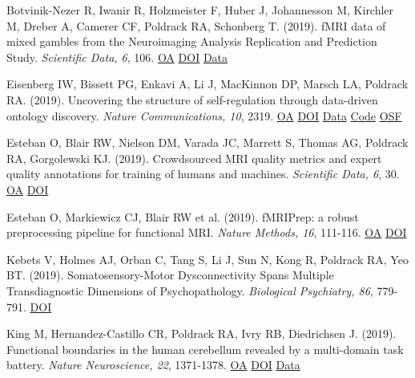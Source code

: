 \documentclass[10pt, letterpaper]{article}
\begin{document}
Botvinik-Nezer R, Iwanir R, Holzmeister F, Huber J, Johannesson M, Kirchler M, Dreber A, Camerer CF, Poldrack RA, Schonberg T.  (2019). fMRI data of mixed gambles from the Neuroimaging Analysis Replication and Prediction Study. \textit{Scientific Data, 6}, 106. \href{https://www.ncbi.nlm.nih.gov/pmc/articles/PMC6602933}{OA} \href{https://doi.org/10.1038/s41597-019-0113-7}{DOI} \href{https://openneuro.org/datasets/ds001734/versions/1.0.5}{Data} \vspace{2mm}

Eisenberg IW, Bissett PG, Enkavi A, Li J, MacKinnon DP, Marsch LA, Poldrack RA.  (2019). Uncovering the structure of self-regulation through data-driven ontology discovery. \textit{Nature Communications, 10}, 2319. \href{https://www.ncbi.nlm.nih.gov/pmc/articles/PMC6534563}{OA} \href{https://doi.org/10.1038/s41467-019-10301-1}{DOI} \href{https://github.com/IanEisenberg/Self_Regulation_Ontology/tree/master/Data}{Data} \href{https://github.com/IanEisenberg/Self_Regulation_Ontology}{Code} \href{https://osf.io/zk6w9/}{OSF} \vspace{2mm}

Esteban O, Blair RW, Nielson DM, Varada JC, Marrett S, Thomas AG, Poldrack RA, Gorgolewski KJ.  (2019). Crowdsourced MRI quality metrics and expert quality annotations for training of humans and machines. \textit{Scientific Data, 6}, 30. \href{https://www.ncbi.nlm.nih.gov/pmc/articles/PMC6472378}{OA} \href{https://doi.org/10.1038/s41597-019-0035-4}{DOI} \vspace{2mm}

Esteban O, Markiewicz CJ, Blair RW et al. (2019). fMRIPrep: a robust preprocessing pipeline for functional MRI. \textit{Nature Methods, 16}, 111-116. \href{https://www.ncbi.nlm.nih.gov/pmc/articles/PMC6319393}{OA} \href{https://doi.org/10.1038/s41592-018-0235-4}{DOI} \vspace{2mm}

Kebets V, Holmes AJ, Orban C, Tang S, Li J, Sun N, Kong R, Poldrack RA, Yeo BT.  (2019). Somatosensory-Motor Dysconnectivity Spans Multiple Transdiagnostic Dimensions of Psychopathology. \textit{Biological Psychiatry, 86}, 779-791. \href{https://doi.org/10.1016/j.biopsych.2019.06.013}{DOI} \vspace{2mm}

King M, Hernandez-Castillo CR, Poldrack RA, Ivry RB, Diedrichsen J.  (2019). Functional boundaries in the human cerebellum revealed by a multi-domain task battery. \textit{Nature Neuroscience, 22}, 1371-1378. \href{https://www.ncbi.nlm.nih.gov/pmc/articles/PMC8312478}{OA} \href{https://doi.org/10.1038/s41593-019-0436-x}{DOI} \href{https://openneuro.org/datasets/ds002105/versions/1.1.0}{Data} \vspace{2mm}
\end{document}
